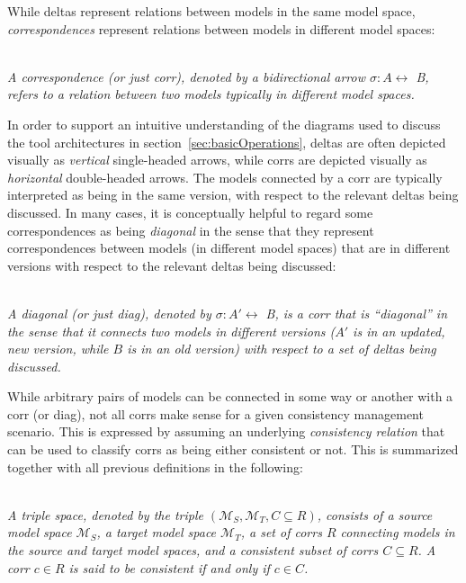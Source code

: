 While deltas represent relations between models in the same model space, \emph{correspondences} represent relations between models in different model spaces:
\begin{definition}
\label{def: corr}~\\
\emph{A correspondence (or just corr), denoted by a bidirectional arrow $\sigma : A \leftrightarrow$ B, refers to a relation between two models typically in different model spaces.}
\end{definition}

In order to support an intuitive understanding of the diagrams used to discuss the tool architectures in section~\ref{sec:basicOperations}, deltas are often depicted visually as \emph{vertical} single-headed arrows, while corrs are depicted visually as \emph{horizontal} double-headed arrows.
The models connected by a corr are typically interpreted as being in the same version, with respect to the relevant deltas being discussed.
In many cases, it is conceptually helpful to regard some correspondences as being \emph{diagonal} in the sense that they represent correspondences between models (in different model spaces) that are in different versions with respect to the relevant deltas being discussed: 
\begin{definition}
\label{def: diag}~\\
\emph{A diagonal (or just diag), denoted by $\sigma : A' \leftrightarrow$ B, is a corr that is ``diagonal'' in the sense that it connects two models in different versions ($A'$ is in an updated, new version, while $B$ is in an old version) with respect to a set of deltas being discussed.} 
\end{definition}

While arbitrary pairs of models can be connected in some way or another with a corr (or diag), not all corrs make sense for a given consistency management scenario.
This is expressed by assuming an underlying \emph{consistency relation} that can be used to classify corrs as being either consistent or not.
This is summarized together with all previous definitions in the following:
\begin{definition}~\\
\emph{A triple space, denoted by the triple $(\mathcal{M}_S, \mathcal{M}_T, C \subseteq R)$, consists of a source model space $\mathcal{M}_S$, a target model space $\mathcal{M}_T$, a set of corrs $R$ connecting models in the source and target model spaces, and a consistent subset of corrs $C \subseteq R$.
A corr $c \in R$ is said to be consistent if and only if $c \in C$.}
\end{definition}

